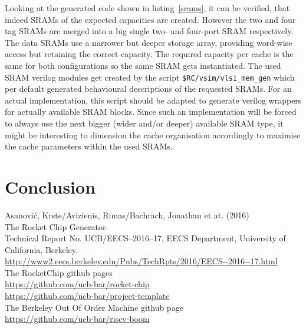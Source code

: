 \documentclass[journal,a4paper]{IEEEtran}
\begin{document}
Looking at the generated code shown in listing~\ref{srams}, it can be verified, that indeed SRAMs of the expected capacities are created.
However the two and four tag SRAMs are merged into a big single two- and four-port SRAM respectively.
The data SRAMs use a narrower but deeper storage array, providing word-wise access but retaining the correct capacity. The required capacity per cache is the same for both configurations so the same SRAM gets instantiated.
The used SRAM verilog modules get created by the script \texttt{\$RC/vsim/vlsi\_mem\_gen} which per default generated behavioural descriptions of the requested SRAMs.
For an actual implementation, this script should be adapted to generate verilog wrappers for actually available SRAM blocks.
Since such an implementation will be forced to always use the next bigger (wider and/or deeper) available SRAM type, it might be interesting to dimension the cache organisation accordingly to maximise the cache parameters within the used SRAMs.








\section{Conclusion}


\bigskip

\begin{thebibliography}{1}
	Asanovi\'c, Krste/Avizienis, Rimas/Bachrach, Jonathan et at. (2016)\\
	The Rocket Chip Generator.\\
	Technical Report No. UCB/EECS--2016--17, EECS Department, University of California, Berkeley.\\
	\url{http://www2.eecs.berkeley.edu/Pubs/TechRpts/2016/EECS--2016--17.html}\\

	The RocketChip github pages\\
	\url{https://github.com/ucb-bar/rocket-chip}\\
	\url{https://github.com/ucb-bar/project-template}\\

	The Berkeley Out Of Order Machine github page\\
	\url{https://github.com/ucb-bar/riscv-boom}\\


\end{thebibliography}
\enlargethispage{-5in}
\end{document}
